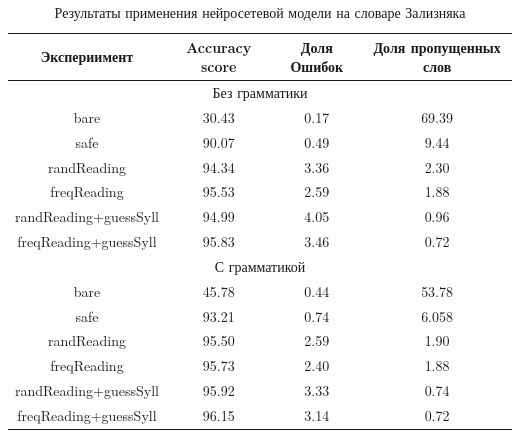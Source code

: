 \documentclass[14pt, a4paper, russian]{extreport}
\begin{document}
\begin{table}[H]
		\caption{Результаты применения нейросетевой модели на словаре Зализняка}
	
	\begin{small}
		\begin{center}
			\begin{tabular}{|c|c|c|c|}
				\hline
				    Экспериимент      & Accuracy score & Доля Ошибок & Доля пропущенных слов \\ \hline
				\multicolumn{4}{|c|}{Без грамматики}                                         \\ \hline
				        bare          &     30.43      &    0.17     &         69.39         \\ \hline
				        safe          &     90.07      &    0.49     &         9.44          \\ \hline
				     randReading      &     94.34      &    3.36     &         2.30          \\ \hline
				     freqReading      &     95.53      &    2.59     &         1.88          \\ \hline
				randReading+guessSyll &     94.99      &    4.05     &         0.96          \\ \hline
				freqReading+guessSyll &     95.83      &    3.46     &         0.72          \\ \hline
				\multicolumn{4}{|c|}{С грамматикой}                                          \\ \hline
				        bare          &     45.78      &    0.44     &         53.78         \\ \hline
				        safe          &     93.21      &    0.74     &         6.058         \\ \hline
				     randReading      &     95.50      &    2.59     &         1.90          \\ \hline
				     freqReading      &     95.73      &    2.40     &         1.88          \\ \hline
				randReading+guessSyll &     95.92      &    3.33     &         0.74          \\ \hline
				freqReading+guessSyll &     96.15      &    3.14     &         0.72          \\ \hline
			\end{tabular}
		\end{center}
	\end{small}
	\label{table:dict_res}
\end{table}
\end{document}
